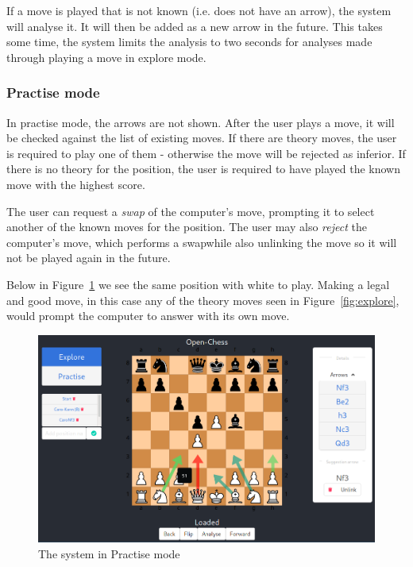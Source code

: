 \documentclass[architecture.tex]{subfiles}
\begin{document}
If a move is played that is not known (i.e. does not have an arrow),
the system will analyse it. It will then be added as a new arrow in the future.
This takes some time, the system limits the analysis to two seconds
for analyses made through playing a move in explore mode.
\subsubsection{Practise mode}
In practise mode, the arrows are not shown. After the user plays a move,
it will be checked against the list of existing moves.
If there are theory moves, the user is required to play one of them - 
otherwise the move will be rejected as inferior.
If there is no theory for the position, the user is required to have played
the known move with the highest score.

The user can request a \textit{swap} of the computer's move, prompting
it to select another of the known moves for the position.
The user may also \textit{reject} the computer's move, which performs a
swapwhile also unlinking the move so it will not be played again in the future.

Below in Figure~\ref{fig:practise} we see the same position with white to play.
Making a legal and good move, in this case any of the theory moves seen in
Figure~\ref{fig:explore}, would prompt the computer to answer with its own move.
\begin{figure}[H]
    \centering
    \includegraphics[width=\linewidth]{figures/explore-overview.png}
    \caption{The system in Practise mode}
    \label{fig:practise}
\end{figure}
\end{document}
